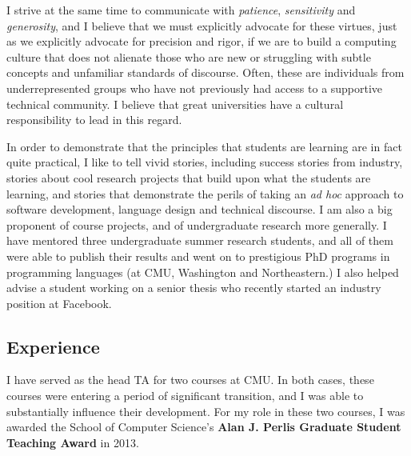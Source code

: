 \documentclass[9pt]{extarticle}
\begin{document}
I strive at the same time to communicate with \emph{patience}, \emph{sensitivity} and \emph{generosity}, and I believe that we must explicitly advocate for these virtues, just as we explicitly advocate for precision and rigor, if we are to build a computing culture that does not alienate those who are new or struggling with subtle concepts and unfamiliar standards of discourse. Often, these are individuals from underrepresented groups who have not previously had access to a supportive technical community. I believe that great universities have a cultural responsibility to lead in this regard.

In order to demonstrate that the principles that students are learning are in fact quite practical, I like to tell vivid stories, including success stories from industry, stories about cool research projects that build upon what the students are learning, and stories that demonstrate the perils of taking an \emph{ad hoc} approach to software development, language design and technical discourse. I am also a big proponent of course projects, and of undergraduate research more generally. I have mentored three undergraduate summer research students, and all of them were able to publish their results and went on to prestigious PhD programs in programming languages (at CMU, Washington and Northeastern.) I also helped advise a student working on a senior thesis who recently started an industry position at Facebook.





\subsection*{Experience}
I have served as the head TA for two courses at CMU. In both cases, these courses were entering a period of significant transition, and I was able to substantially influence their development. For my role in these two courses, I was awarded the School of Computer Science's \textbf{Alan J. Perlis Graduate Student Teaching Award} in 2013.
\end{document}
